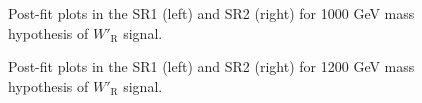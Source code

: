 \begin{figure}[H]
  \centering
  \caption{Post-fit plots in the SR1 (left) and SR2 (right) for 1000 GeV mass hypothesis of $W'_{\text{R}}$ signal.}
  \label{fig:Postfit_WpRH1000_Asimov}
\end{figure}
\begin{figure}[H]
  \centering
  \caption{Post-fit plots in the SR1 (left) and SR2 (right) for 1200 GeV mass hypothesis of $W'_{\text{R}}$ signal.}
  \label{fig:Postfit_WpRH1200_Asimov}
\end{figure}
